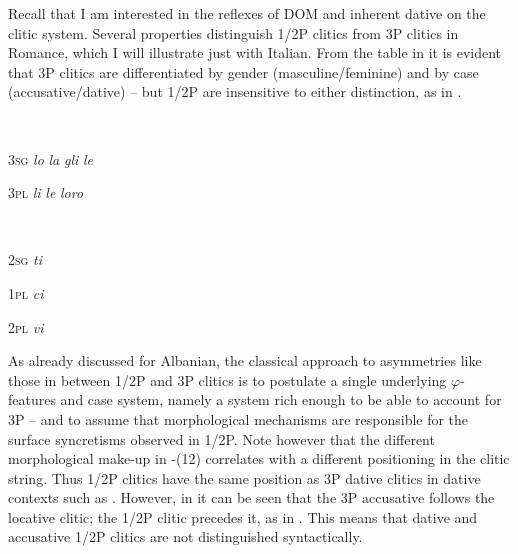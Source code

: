 \documentclass[output=paper]{langscibook}
\begin{document}
Recall that I am interested in the reflexes of DOM and inherent dative on the clitic system. {Several properties distinguish 1/2P clitics from 3P clitics in Romance, which I will illustrate just with Italian. From the table in  it is evident that 3P clitics are differentiated by gender (masculine/feminine) and by case (accusative/dative) – but 1/2P are insensitive to either distinction, as in .}

\ea\label{ex:manzini:}
{}\\
\z

\textsc{3sg}    \textit{lo}     \textit{la}     \textit{gli}     \textit{le}   


\textsc{3pl}    \textit{li}     \textit{le}     \textit{loro}  

\ea\label{ex:manzini:}
{}\\
\z

{\textsc{2sg}    \textit{ti}}



{\textsc{1pl}    \textit{ci}}


{\textsc{2pl}    \textit{vi}}

As already discussed for Albanian, the classical approach to asymmetries like those in  between 1/2P and 3P clitics is to postulate a single underlying $\varphi ${}-features and case system, namely a system rich enough to be able to account for 3P – and to assume that morphological mechanisms are responsible for the surface syncretisms observed in 1/2P. Note however that the different morphological make-up in -(12) correlates with a different positioning in the clitic string. Thus 1/2P clitics have the same position as 3P dative clitics in dative contexts such as . However, in  it can be seen that the 3P accusative follows the locative clitic; the 1/2P clitic precedes it, as in . This means that dative and accusative 1/2P clitics are not distinguished syntactically.
\end{document}
